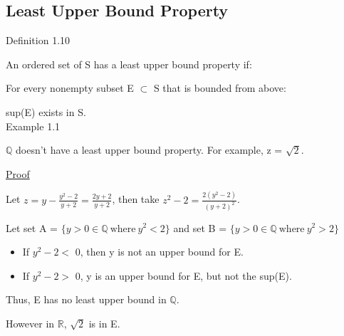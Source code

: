 \subsection{Least Upper Bound Property}

{ \color{blue} Definition 1.10 }

\qquad An ordered set of S has a least upper bound property if:

\qquad \qquad For every nonempty subset E $ \subset $ S that is bounded from above:

\qquad \qquad \qquad sup(E) exists in S. \\

{ \color{red} Example 1.1 }

\qquad $ \mathbb{Q} $ doesn't have a least upper bound property. For example, z = $ \sqrt{2} $.

{\color{magenta} \underline{Proof}}

\qquad Let $ z = y - \frac{y^2-2}{y+2} = \frac{2y+2}{y+2} $, then take $ z^2-2 = \frac{2(y^2-2)}{(y+2)^2} $.

\qquad Let set A = $ \{ y > 0 \in \mathbb{Q} \ \text{where} \ y^2 < 2 \} $ and
set B = $ \{ y > 0 \in \mathbb{Q} \ \text{where} \ y^2 > 2 \} $

\begin{itemize}[leftmargin=2cm]
	\item If $ y^2-2 < $ 0, then y is not an upper bound for E.
	\item If $ y^2-2 > $ 0, y is an upper bound for E, but not the sup(E).
\end{itemize}

\qquad Thus, E has no least upper bound in $ \mathbb{Q} $.

\qquad However in $ \mathbb{R} $, $ \sqrt{2} $ is in E.
